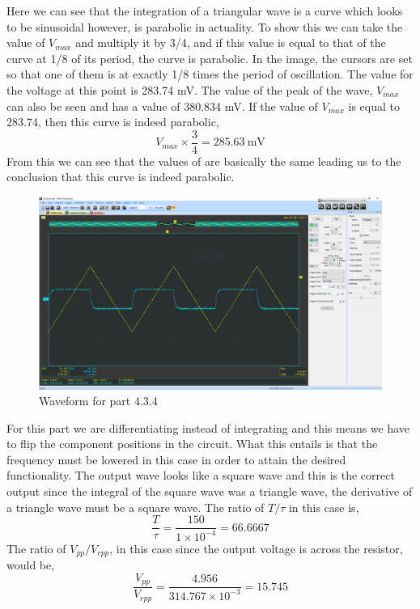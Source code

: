 \documentclass[12pt]{article}
\begin{document}
    \par Here we can see that the integration of a triangular wave is a curve which looks to be sinusoidal however, is parabolic in actuality. To show this we can take the value of $ V_{max} $ and multiply it by 3/4, and if this value is equal to that of the curve at 1/8 of its period, the curve is parabolic. In the image, the cursors are set so that one of them is at exactly 1/8 times the period of oscillation. The value for the voltage at this point is 283.74 mV. The value of the peak of the wave, $ V_{max} $ can also be seen and has a value of 380.834 mV. If the value of $ V_{max} $ is equal to 283.74, then this curve is indeed parabolic,
    \[
        V_{max} \times \frac{3}{4} = 285.63\ \text{mV}
    \]
    From this we can see that the values of are basically the same leading us to the conclusion that this curve is indeed parabolic.
    \newpage
    \begin{figure}[h]
        \centering
        \includegraphics[width=\textwidth]{4.3.4.png}
        \caption{Waveform for part 4.3.4}
    \end{figure}
    \par For this part we are differentiating instead of integrating and this means we have to flip the component positions in the circuit. What this entails is that the frequency must be lowered in this case in order to attain the desired functionality. The output wave looks like a square wave and this is the correct output since the integral of the square wave was a triangle wave, the derivative of a triangle wave must be a square wave. The ratio of $ T / \tau $ in this case is,
    \[
        \frac{T}{\tau} = \frac{150}{1\times 10^{-4}} = 66.6667
    \]
    The ratio of $ V_{pp} / V_{rpp} $, in this case since the output voltage is across the resistor, would be,
    \[
        \frac{V_{pp}}{V_{rpp}} = \frac{4.956}{314.767 \times 10^{-3}} = 15.745
    \]
\end{document}
